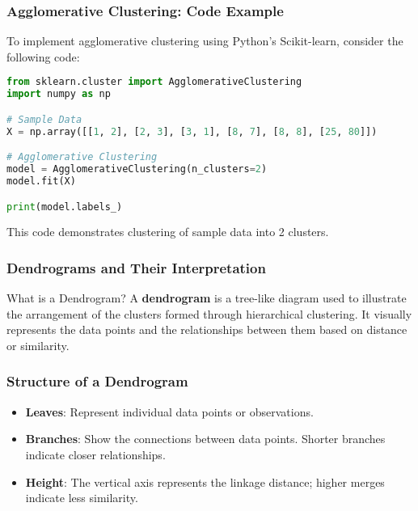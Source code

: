 \documentclass[aspectratio=169]{beamer}
\begin{document}
\begin{frame}[fragile]
    \frametitle{Agglomerative Clustering: Code Example}
    To implement agglomerative clustering using Python's Scikit-learn, consider the following code:

    \begin{lstlisting}[language=Python]
from sklearn.cluster import AgglomerativeClustering
import numpy as np

# Sample Data
X = np.array([[1, 2], [2, 3], [3, 1], [8, 7], [8, 8], [25, 80]])

# Agglomerative Clustering
model = AgglomerativeClustering(n_clusters=2)
model.fit(X)

print(model.labels_)
    \end{lstlisting}
    
    This code demonstrates clustering of sample data into 2 clusters.
\end{frame}

\begin{frame}[fragile]
    \frametitle{Dendrograms and Their Interpretation}
    \begin{block}{What is a Dendrogram?}
        A \textbf{dendrogram} is a tree-like diagram used to illustrate the arrangement of the clusters formed through hierarchical clustering.
        It visually represents the data points and the relationships between them based on distance or similarity.
    \end{block}
\end{frame}

\begin{frame}[fragile]
    \frametitle{Structure of a Dendrogram}
    \begin{itemize}
        \item \textbf{Leaves}: Represent individual data points or observations.
        \item \textbf{Branches}: Show the connections between data points. Shorter branches indicate closer relationships.
        \item \textbf{Height}: The vertical axis represents the linkage distance; higher merges indicate less similarity.
    \end{itemize}
\end{frame}
\end{document}
